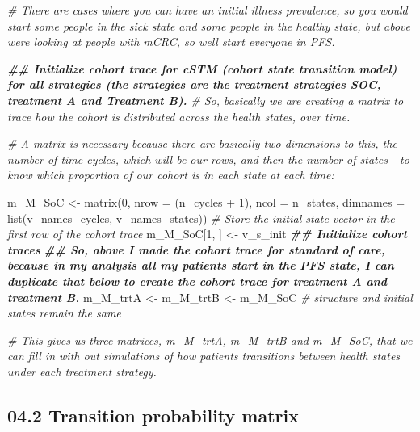 \documentclass[
]{article}
\newenvironment{Shaded}{\begin{snugshade}}{\end{snugshade}}
\newcommand{\AttributeTok}[1]{\textcolor[rgb]{0.77,0.63,0.00}{#1}}
\newcommand{\CommentTok}[1]{\textcolor[rgb]{0.56,0.35,0.01}{\textit{#1}}}
\newcommand{\DecValTok}[1]{\textcolor[rgb]{0.00,0.00,0.81}{#1}}
\newcommand{\DocumentationTok}[1]{\textcolor[rgb]{0.56,0.35,0.01}{\textbf{\textit{#1}}}}
\newcommand{\FunctionTok}[1]{\textcolor[rgb]{0.00,0.00,0.00}{#1}}
\newcommand{\NormalTok}[1]{#1}
\newcommand{\OtherTok}[1]{\textcolor[rgb]{0.56,0.35,0.01}{#1}}
\newcommand{\SpecialCharTok}[1]{\textcolor[rgb]{0.00,0.00,0.00}{#1}}
\begin{document}
\begin{Shaded}
\begin{Highlighting}[]
\CommentTok{\# There are cases where you can have an initial illness prevalence, so you would start some people in the sick state and some people in the healthy state, but above we\textquotesingle{}re looking at people with mCRC, so we\textquotesingle{}ll start everyone in PFS.}



\DocumentationTok{\#\# Initialize cohort trace for cSTM (cohort state transition model) for all strategies (the strategies are the treatment strategies SOC, treatment A and Treatment B).}
\CommentTok{\# So, basically we are creating a matrix to trace how the cohort is distributed across the health states, over time. }

\CommentTok{\# A matrix is necessary because there are basically two dimensions to this, the number of time cycles, which will be our rows, and then the number of states {-} to know which proportion of our cohort is in each state at each time:}

\NormalTok{m\_M\_SoC }\OtherTok{\textless{}{-}} \FunctionTok{matrix}\NormalTok{(}\DecValTok{0}\NormalTok{, }
                  \AttributeTok{nrow =}\NormalTok{ (n\_cycles }\SpecialCharTok{+} \DecValTok{1}\NormalTok{), }\AttributeTok{ncol =}\NormalTok{ n\_states, }
                  \AttributeTok{dimnames =} \FunctionTok{list}\NormalTok{(v\_names\_cycles, v\_names\_states))}
\CommentTok{\# Store the initial state vector in the first row of the cohort trace}
\NormalTok{m\_M\_SoC[}\DecValTok{1}\NormalTok{, ] }\OtherTok{\textless{}{-}}\NormalTok{ v\_s\_init}
\DocumentationTok{\#\# Initialize cohort traces}
\DocumentationTok{\#\# So, above I made the cohort trace for standard of care, because in my analysis all my patients start in the PFS state, I can duplicate that below to create the cohort trace for treatment A and treatment B.}
\NormalTok{m\_M\_trtA }\OtherTok{\textless{}{-}}\NormalTok{ m\_M\_trtB }\OtherTok{\textless{}{-}}\NormalTok{ m\_M\_SoC }\CommentTok{\# structure and initial states remain the same}

\CommentTok{\# This gives us three matrices, m\_M\_trtA, m\_M\_trtB and m\_M\_SoC, that we can fill in with out simulations of how patients transitions between health states under each treatment strategy.}
\end{Highlighting}
\end{Shaded}

\hypertarget{transition-probability-matrix}{%
\subsection{04.2 Transition probability
matrix}\label{transition-probability-matrix}}
\end{document}
